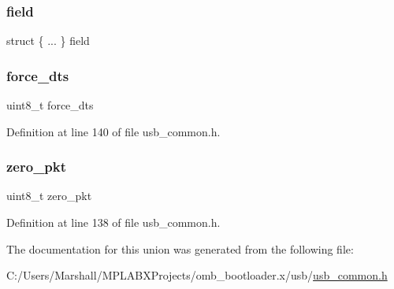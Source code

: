 \subsubsection{\texorpdfstring{field}{field}}
{\footnotesize\ttfamily struct \{ ... \}  field}

\mbox{\label{union_t_r_a_n_s_f_e_r___f_l_a_g_s_a905113be5625941ed80e4710f60fe7ef}} 
\subsubsection{\texorpdfstring{force\_dts}{force\_dts}}
{\footnotesize\ttfamily uint8\+\_\+t force\+\_\+dts}



Definition at line 140 of file usb\+\_\+common.\+h.

\mbox{\label{union_t_r_a_n_s_f_e_r___f_l_a_g_s_a3dbf03d72e11e17778bca583ab0381cf}} 
\subsubsection{\texorpdfstring{zero\_pkt}{zero\_pkt}}
{\footnotesize\ttfamily uint8\+\_\+t zero\+\_\+pkt}



Definition at line 138 of file usb\+\_\+common.\+h.



The documentation for this union was generated from the following file\+:\begin{DoxyCompactItemize}
\item 
C\+:/\+Users/\+Marshall/\+M\+P\+L\+A\+B\+X\+Projects/omb\+\_\+bootloader.\+x/usb/\mbox{\hyperlink{usb__common_8h}{usb\+\_\+common.\+h}}\end{DoxyCompactItemize}
